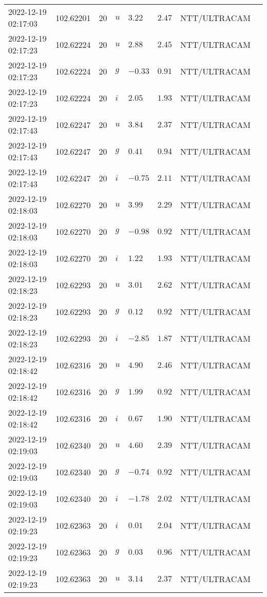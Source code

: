 \documentclass{nature_plusfigure}
\begin{document}
\begin{supplement}
\begin{center}
\begin{longtable}{llllllll}
2022-12-19 02:17:03 & 102.62201 & 20 & $u$ & $3.22$ & $2.47$ & NTT/ULTRACAM &  \\ 
2022-12-19 02:17:23 & 102.62224 & 20 & $u$ & $2.88$ & $2.45$ & NTT/ULTRACAM &  \\ 
2022-12-19 02:17:23 & 102.62224 & 20 & $g$ & $-0.33$ & $0.91$ & NTT/ULTRACAM &  \\ 
2022-12-19 02:17:23 & 102.62224 & 20 & $i$ & $2.05$ & $1.93$ & NTT/ULTRACAM &  \\ 
2022-12-19 02:17:43 & 102.62247 & 20 & $u$ & $3.84$ & $2.37$ & NTT/ULTRACAM &  \\ 
2022-12-19 02:17:43 & 102.62247 & 20 & $g$ & $0.41$ & $0.94$ & NTT/ULTRACAM &  \\ 
2022-12-19 02:17:43 & 102.62247 & 20 & $i$ & $-0.75$ & $2.11$ & NTT/ULTRACAM &  \\ 
2022-12-19 02:18:03 & 102.62270 & 20 & $u$ & $3.99$ & $2.29$ & NTT/ULTRACAM &  \\ 
2022-12-19 02:18:03 & 102.62270 & 20 & $g$ & $-0.98$ & $0.92$ & NTT/ULTRACAM &  \\ 
2022-12-19 02:18:03 & 102.62270 & 20 & $i$ & $1.22$ & $1.93$ & NTT/ULTRACAM &  \\ 
2022-12-19 02:18:23 & 102.62293 & 20 & $u$ & $3.01$ & $2.62$ & NTT/ULTRACAM &  \\ 
2022-12-19 02:18:23 & 102.62293 & 20 & $g$ & $0.12$ & $0.92$ & NTT/ULTRACAM &  \\ 
2022-12-19 02:18:23 & 102.62293 & 20 & $i$ & $-2.85$ & $1.87$ & NTT/ULTRACAM &  \\ 
2022-12-19 02:18:42 & 102.62316 & 20 & $u$ & $4.90$ & $2.46$ & NTT/ULTRACAM &  \\ 
2022-12-19 02:18:42 & 102.62316 & 20 & $g$ & $1.99$ & $0.92$ & NTT/ULTRACAM &  \\ 
2022-12-19 02:18:42 & 102.62316 & 20 & $i$ & $0.67$ & $1.90$ & NTT/ULTRACAM &  \\ 
2022-12-19 02:19:03 & 102.62340 & 20 & $u$ & $4.60$ & $2.39$ & NTT/ULTRACAM &  \\ 
2022-12-19 02:19:03 & 102.62340 & 20 & $g$ & $-0.74$ & $0.92$ & NTT/ULTRACAM &  \\ 
2022-12-19 02:19:03 & 102.62340 & 20 & $i$ & $-1.78$ & $2.02$ & NTT/ULTRACAM &  \\ 
2022-12-19 02:19:23 & 102.62363 & 20 & $i$ & $0.01$ & $2.04$ & NTT/ULTRACAM &  \\ 
2022-12-19 02:19:23 & 102.62363 & 20 & $g$ & $0.03$ & $0.96$ & NTT/ULTRACAM &  \\ 
2022-12-19 02:19:23 & 102.62363 & 20 & $u$ & $3.14$ & $2.37$ & NTT/ULTRACAM &  \\ 

\end{longtable}
\end{center}
\end{supplement}
\end{document}
